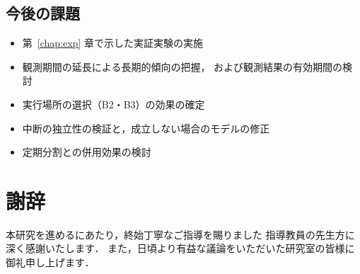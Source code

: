 \documentclass[11pt,a4paper]{ltjsreport}
\begin{document}
\section{今後の課題}

\begin{itemize}
  \item 第~\ref{chap:exp} 章で示した実証実験の実施
  \item 観測期間の延長による長期的傾向の把握，
        および観測結果の有効期間の検討
  \item 実行場所の選択（B2・B3）の効果の確定
  \item 中断の独立性の検証と，成立しない場合のモデルの修正
  \item 定期分割との併用効果の検討
\end{itemize}

\chapter*{謝辞}

本研究を進めるにあたり，終始丁寧なご指導を賜りました
指導教員の先生方に深く感謝いたします．
また，日頃より有益な議論をいただいた研究室の皆様に御礼申し上げます．
\end{document}
